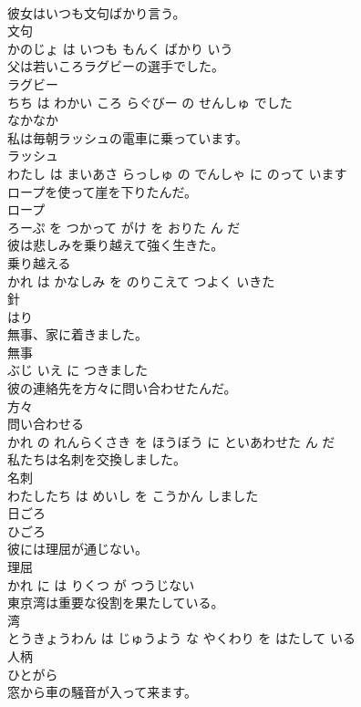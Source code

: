 \documentclass[8pt]{extreport}
\begin{document}
\begin{CJK}{UTF8}{min}
\\	彼女はいつも文句ばかり言う。	
\\	文句 
\\	かのじょ は いつも もんく ばかり いう			
\\	父は若いころラグビーの選手でした。	
\\	ラグビー 
\\	ちち は わかい ころ らぐびー の せんしゅ でした			
\\	なかなか	
\\	私は毎朝ラッシュの電車に乗っています。	
\\	ラッシュ 
\\	わたし は まいあさ らっしゅ の でんしゃ に のって います			
\\	ロープを使って崖を下りたんだ。	
\\	ロープ 
\\	ろーぷ を つかって がけ を おりた ん だ			
\\	彼は悲しみを乗り越えて強く生きた。	
\\	乗り越える 
\\	かれ は かなしみ を のりこえて つよく いきた			
\\	針	
\\	はり		
\\	無事、家に着きました。	
\\	無事 
\\	ぶじ いえ に つきました			
\\	彼の連絡先を方々に問い合わせたんだ。	
\\	方々 
\\	問い合わせる 
\\	かれ の れんらくさき を ほうぼう に といあわせた ん だ			
\\	私たちは名刺を交換しました。	
\\	名刺 
\\	わたしたち は めいし を こうかん しました			
\\	日ごろ	
\\	ひごろ		
\\	彼には理屈が通じない。	
\\	理屈 
\\	かれ に は りくつ が つうじない			
\\	東京湾は重要な役割を果たしている。	
\\	湾 
\\	とうきょうわん は じゅうよう な やくわり を はたして いる			
\\	人柄	
\\	ひとがら		
\\	窓から車の騒音が入って来ます。	

\end{CJK}
\end{document}
